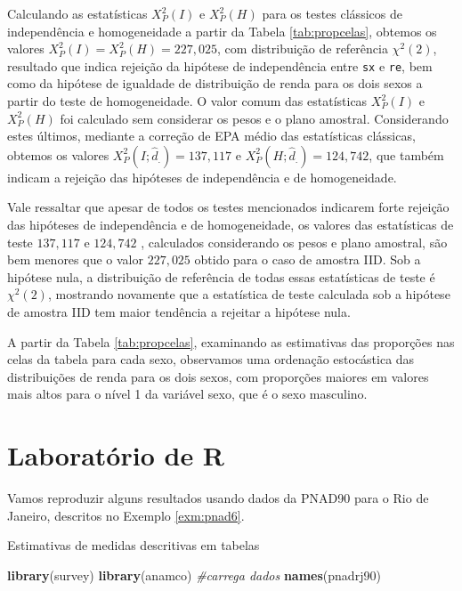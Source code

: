 \documentclass[]{book}
\newenvironment{Shaded}{\begin{snugshade}}{\end{snugshade}}
\newcommand{\KeywordTok}[1]{\textcolor[rgb]{0.13,0.29,0.53}{\textbf{#1}}}
\newcommand{\CommentTok}[1]{\textcolor[rgb]{0.56,0.35,0.01}{\textit{#1}}}
\newcommand{\NormalTok}[1]{#1}
\theoremstyle{definition}
\theoremstyle{definition}
\theoremstyle{definition}
\theoremstyle{remark}
\let\BeginKnitrBlock\begin \let\EndKnitrBlock\end
\begin{document}
Calculando as estatísticas \(X_{P}^{2}\left( I\right)\) e
\(X_{P}^{2}\left( H\right)\) para os testes clássicos de independência e
homogeneidade a partir da Tabela \ref{tab:propcelas}, obtemos os valores
\(X_{P}^{2}\left( I\right) =X_{P}^{2}\left( H\right) =227,025\), com
distribuição de referência \(\chi ^{2}\left( 2\right)\), resultado que
indica rejeição da hipótese de independência entre \texttt{sx} e
\texttt{re}, bem como da hipótese de igualdade de distribuição de renda
para os dois sexos a partir do teste de homogeneidade. O valor comum das
estatísticas \(X_{P}^{2}\left( I\right)\) e \(X_{P}^{2}\left( H\right)\)
foi calculado sem considerar os pesos e o plano amostral. Considerando
estes últimos, mediante a correção de EPA médio das estatísticas
clássicas, obtemos os valores
\(X_{P}^{2}\left( I;\hat{d} _{.}\right) =137,117\) e
\(X_{P}^{2}\left( H;\hat{d}_{.}\right) =124,742\), que também indicam a
rejeição das hipóteses de independência e de homogeneidade.

Vale ressaltar que apesar de todos os testes mencionados indicarem forte
rejeição das hipóteses de independência e de homogeneidade, os valores
das estatísticas de teste \(137,117\) e \(124,742\) , calculados
considerando os pesos e plano amostral, são bem menores que o valor
\(227,025\) obtido para o caso de amostra IID. Sob a hipótese nula, a
distribuição de referência de todas essas estatísticas de teste é
\(\chi ^{2}\left( 2\right)\), mostrando novamente que a estatística de
teste calculada sob a hipótese de amostra IID tem maior tendência a
rejeitar a hipótese nula.

A partir da Tabela \ref{tab:propcelas}, examinando as estimativas das
proporções nas celas da tabela para cada sexo, observamos uma ordenação
estocástica das distribuições de renda para os dois sexos, com
proporções maiores em valores mais altos para o nível 1 da variável
sexo, que é o sexo masculino.

\section{Laboratório de R}\label{laboratorio-de-r-5}

Vamos reproduzir alguns resultados usando dados da PNAD90 para o Rio de
Janeiro, descritos no Exemplo \ref{exm:pnad6}.

\BeginKnitrBlock{example}
\protect\hypertarget{exm:exe82}{}{\label{exm:exe82} }Estimativas de medidas
descritivas em tabelas
\EndKnitrBlock{example}

\begin{Shaded}
\begin{Highlighting}[]
\KeywordTok{library}\NormalTok{(survey)}
\KeywordTok{library}\NormalTok{(anamco) }\CommentTok{#carrega dados}
\KeywordTok{names}\NormalTok{(pnadrj90)}
\end{Highlighting}
\end{Shaded}
\end{document}
